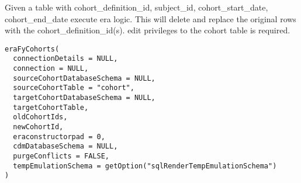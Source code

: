 \documentclass[a4paper]{book}
\begin{document}
%
\begin{Description}\relax
Given a table with cohort\_definition\_id, subject\_id, cohort\_start\_date,
cohort\_end\_date execute era logic. This will delete and replace the
original rows with the cohort\_definition\_id(s). edit privileges
to the cohort table is required.

\strong{[Stable]}
\end{Description}
%
\begin{Usage}
\begin{verbatim}
eraFyCohorts(
  connectionDetails = NULL,
  connection = NULL,
  sourceCohortDatabaseSchema = NULL,
  sourceCohortTable = "cohort",
  targetCohortDatabaseSchema = NULL,
  targetCohortTable,
  oldCohortIds,
  newCohortId,
  eraconstructorpad = 0,
  cdmDatabaseSchema = NULL,
  purgeConflicts = FALSE,
  tempEmulationSchema = getOption("sqlRenderTempEmulationSchema")
)
\end{verbatim}
\end{Usage}
%
\end{document}

